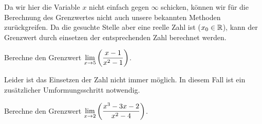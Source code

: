 \documentclass[11pt,oneside]{article}
\begin{document}
	Da wir hier die Variable $x$ nicht einfach gegen $\infty$ schicken, können wir für die Berechnung des Grenzwertes nicht auch unsere bekannten Methoden zurückgreifen. Da die gesuchte Stelle aber eine reelle Zahl ist ($x_0\in\mathbb{R}$), kann der Grenzwert durch einsetzen der entsprechenden Zahl berechnet werden.
	\begin{beispiel}
		Berechne den Grenzwert $\displaystyle\lim_{x\rightarrow 5}\left(\frac{x-1}{x^2-1}\right)$.\vspace{5pt}\\
	\end{beispiel}
	Leider ist das Einsetzen der Zahl nicht immer möglich. In diesem Fall ist ein zusätzlicher Umformungsschritt notwendig.
	\begin{beispiel}
		Berechne den Grenzwert $\displaystyle\lim_{x\rightarrow 2}\left(\frac{x^3-3x-2}{x^2-4}\right)$.\vspace{5pt}\\\karos{4.5}
	\end{beispiel}
\end{document}
